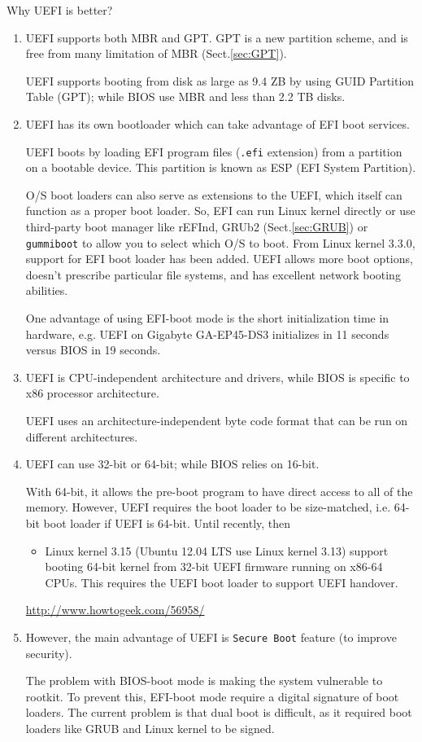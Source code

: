Why UEFI is better?
\begin{enumerate}
  \item UEFI supports both MBR and GPT. GPT is a new partition scheme, and is
  free from many limitation of MBR (Sect.\ref{sec:GPT}).

UEFI supports booting from disk as large as 9.4 ZB by using GUID Partition Table
(GPT); while BIOS use MBR and less than 2.2 TB disks. 

  \item  UEFI has its own bootloader which can take advantage of EFI boot
  services.

UEFI boots by loading EFI program files (\verb!.efi! extension)
from a partition on a bootable device. This partition is known as ESP (EFI
System Partition). 

O/S boot loaders can also serve as extensions to the UEFI, which itself can
function as a proper boot loader. So, EFI can run Linux kernel directly or use
third-party boot manager like rEFInd, GRUb2 (Sect.\ref{sec:GRUB}) or
\verb!gummiboot! to allow you to select which O/S to boot. From Linux kernel
3.3.0, support for EFI boot loader has been added. UEFI allows more boot
options, doesn't prescribe particular file systems, and has excellent network
booting abilities.

One advantage of using EFI-boot mode is the short initialization time in
hardware, e.g. UEFI on Gigabyte GA-EP45-DS3 initializes in 11 seconds versus
BIOS in 19 seconds. 

  \item  UEFI is CPU-independent architecture and drivers, while BIOS
is specific to x86 processor architecture. 

UEFI uses an architecture-independent byte code format that can be run on
different architectures.

  \item UEFI can use 32-bit or 64-bit; while BIOS relies on 16-bit. 

With 64-bit, it allows the pre-boot program to have direct access to all of the
memory. However, UEFI requires the boot loader to be size-matched, i.e. 64-bit
boot loader if UEFI is 64-bit. Until recently, then
\begin{itemize}
  \item Linux kernel 3.15 (Ubuntu 12.04 LTS use Linux kernel 3.13) support
  booting 64-bit kernel from 32-bit  UEFI firmware running on x86-64 CPUs. This
  requires the UEFI boot loader to support UEFI handover.
\end{itemize}
\url{http://www.howtogeek.com/56958/}

  \item However, the main advantage of UEFI is \verb!Secure Boot! feature (to
  improve security).
  
The problem with BIOS-boot mode is making the system vulnerable to rootkit. To
prevent this, EFI-boot mode require a digital signature of boot loaders. The
current problem is that dual boot is difficult, as it required boot loaders like
GRUB and Linux kernel to be signed.
\end{enumerate}

